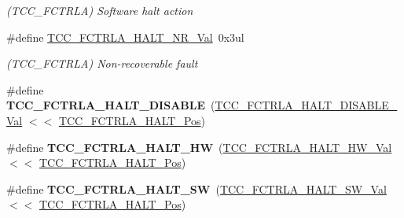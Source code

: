 \begin{DoxyCompactItemize}
\begin{DoxyCompactList}\small\item\em (T\+C\+C\+\_\+\+F\+C\+T\+R\+L\+A) Software halt action \end{DoxyCompactList}\item 
\hypertarget{group___s_a_m_l21___t_c_c_gaf7cb8b989556f89d502c134fa50b5c08}{}\#define \hyperlink{group___s_a_m_l21___t_c_c_gaf7cb8b989556f89d502c134fa50b5c08}{T\+C\+C\+\_\+\+F\+C\+T\+R\+L\+A\+\_\+\+H\+A\+L\+T\+\_\+\+N\+R\+\_\+\+Val}~0x3ul\label{group___s_a_m_l21___t_c_c_gaf7cb8b989556f89d502c134fa50b5c08}

\begin{DoxyCompactList}\small\item\em (T\+C\+C\+\_\+\+F\+C\+T\+R\+L\+A) Non-\/recoverable fault \end{DoxyCompactList}\item 
\hypertarget{group___s_a_m_l21___t_c_c_gaa9ed79ddb4e290da44dfe85df358bbee}{}\#define {\bfseries T\+C\+C\+\_\+\+F\+C\+T\+R\+L\+A\+\_\+\+H\+A\+L\+T\+\_\+\+D\+I\+S\+A\+B\+L\+E}~(\hyperlink{group___s_a_m_l21___t_c_c_gac436323e2dbed407d23750b4aa200090}{T\+C\+C\+\_\+\+F\+C\+T\+R\+L\+A\+\_\+\+H\+A\+L\+T\+\_\+\+D\+I\+S\+A\+B\+L\+E\+\_\+\+Val}   $<$$<$ \hyperlink{group___s_a_m_l21___t_c_c_ga8057b61f673517b6a99ea43d1942b094}{T\+C\+C\+\_\+\+F\+C\+T\+R\+L\+A\+\_\+\+H\+A\+L\+T\+\_\+\+Pos})\label{group___s_a_m_l21___t_c_c_gaa9ed79ddb4e290da44dfe85df358bbee}

\item 
\hypertarget{group___s_a_m_l21___t_c_c_gac1b3ba43a7ab006d55121db8aadab533}{}\#define {\bfseries T\+C\+C\+\_\+\+F\+C\+T\+R\+L\+A\+\_\+\+H\+A\+L\+T\+\_\+\+H\+W}~(\hyperlink{group___s_a_m_l21___t_c_c_ga4b0ed21a650bc49adc693fc7f32862c4}{T\+C\+C\+\_\+\+F\+C\+T\+R\+L\+A\+\_\+\+H\+A\+L\+T\+\_\+\+H\+W\+\_\+\+Val}        $<$$<$ \hyperlink{group___s_a_m_l21___t_c_c_ga8057b61f673517b6a99ea43d1942b094}{T\+C\+C\+\_\+\+F\+C\+T\+R\+L\+A\+\_\+\+H\+A\+L\+T\+\_\+\+Pos})\label{group___s_a_m_l21___t_c_c_gac1b3ba43a7ab006d55121db8aadab533}

\item 
\hypertarget{group___s_a_m_l21___t_c_c_gafbcad83a50e7a4a2bd646e2cceac56d2}{}\#define {\bfseries T\+C\+C\+\_\+\+F\+C\+T\+R\+L\+A\+\_\+\+H\+A\+L\+T\+\_\+\+S\+W}~(\hyperlink{group___s_a_m_l21___t_c_c_ga0563bbeed823f848ce15d69fd7de2d3f}{T\+C\+C\+\_\+\+F\+C\+T\+R\+L\+A\+\_\+\+H\+A\+L\+T\+\_\+\+S\+W\+\_\+\+Val}        $<$$<$ \hyperlink{group___s_a_m_l21___t_c_c_ga8057b61f673517b6a99ea43d1942b094}{T\+C\+C\+\_\+\+F\+C\+T\+R\+L\+A\+\_\+\+H\+A\+L\+T\+\_\+\+Pos})\label{group___s_a_m_l21___t_c_c_gafbcad83a50e7a4a2bd646e2cceac56d2}


\end{DoxyCompactItemize}

